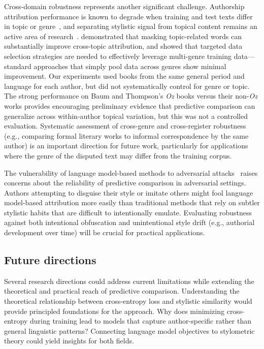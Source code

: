 \documentclass[11pt]{article}
\begin{document}
Cross-domain robustness represents another significant challenge.
Authorship attribution performance is known to degrade when training and test
texts differ in topic or genre~\citep{Stam09, BarlStam20}, and separating
stylistic signal from topical content remains an active area of
research~\citep{Stam18, FincBosc24}. \citet{Stam18} demonstrated that masking
topic-related words can substantially improve cross-topic attribution, and
\citet{FincBosc24} showed that targeted data selection strategies are needed to
effectively leverage multi-genre training data---standard approaches that
simply pool data across genres show minimal improvement. Our experiments used
books from the same general period and language for each author, but did not
systematically control for genre or topic. The strong performance on Baum and
Thompson's \emph{Oz} books versus their non-\emph{Oz} works provides
encouraging preliminary evidence that predictive comparison can generalize
across within-author topical variation, but this was not a controlled
evaluation. Systematic assessment of cross-genre and cross-register robustness
(e.g., comparing formal literary works to informal correspondence by the same
author) is an important direction for future work, particularly for
applications where the genre of the disputed text may differ from the training
corpus.

The vulnerability of language model-based methods to adversarial
attacks~\citep{QuirMaie19} raises concerns about the reliability of predictive
comparison in adversarial settings. Authors attempting to disguise their style
or imitate others might fool language model-based attribution more easily than
traditional methods that rely on subtler stylistic habits that are difficult to
intentionally emulate. Evaluating robustness against both intentional
obfuscation and unintentional style drift (e.g., authorial development over
time) will be crucial for practical applications.

\subsection{Future directions}

Several research directions could address current limitations while extending
the theoretical and practical reach of predictive comparison. Understanding the
theoretical relationship between cross-entropy loss and stylistic similarity
would provide principled foundations for the approach. Why does minimizing
cross-entropy during training lead to models that capture author-specific
rather than general linguistic patterns? Connecting language model objectives
to stylometric theory could yield insights for both fields.
\end{document}
